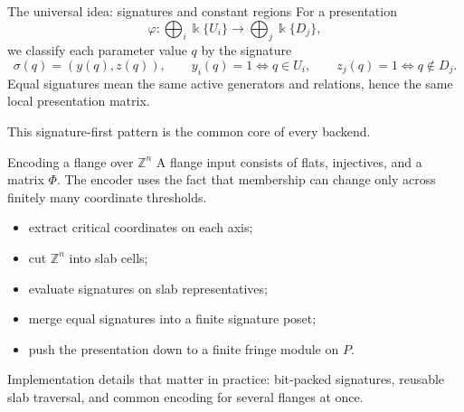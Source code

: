 \documentclass[aspectratio=169,11pt]{beamer}
\newcommand{\kk}{\Bbbk}
\newcommand{\Z}{\mathbb{Z}}
\begin{document}
\begin{frame}{The universal idea: signatures and constant regions}
\small
For a presentation
\[
\varphi:\bigoplus_i \kk\{U_i\} \longrightarrow \bigoplus_j \kk\{D_j\},
\]
we classify each parameter value $q$ by the signature
\[
\sigma(q)=(y(q),z(q)),
\qquad
y_i(q)=1\iff q\in U_i,
\qquad
z_j(q)=1\iff q\notin D_j.
\]
Equal signatures mean the same active generators and relations, hence the same local presentation matrix.

\medskip
\centering
{}

\medskip
\raggedright
This signature-first pattern is the common core of every backend.
\end{frame}

\begin{frame}{Encoding a flange over $\Z^n$}
\small
A flange input consists of flats, injectives, and a matrix $\Phi$.  The encoder uses the fact that membership can change only across finitely many coordinate thresholds.

\begin{itemize}
  \item extract critical coordinates on each axis;
  \item cut $\Z^n$ into slab cells;
  \item evaluate signatures on slab representatives;
  \item merge equal signatures into a finite signature poset;
  \item push the presentation down to a finite fringe module on $P$.
\end{itemize}

\raggedright
Implementation details that matter in practice: bit-packed signatures, reusable slab traversal, and common encoding for several flanges at once.

\end{frame}
\end{document}
